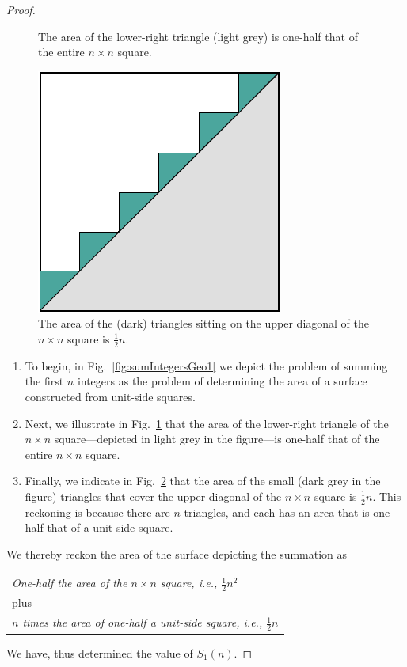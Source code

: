 \begin{proof}
\begin{figure}[h]
\begin{center}
\caption{The area of the lower-right triangle (light grey) is one-half that of
  the entire $n \times n$ square.}
       \label{fig:sumIntegersGeo2}
\end{center}
\end{figure}
\begin{figure}[h]
\begin{center}
       \includegraphics[scale=0.4]{FiguresMaths/SumIntegersGeometricFinal}
\caption{The area of the (dark) triangles sitting on the upper
  diagonal of the $n \times n$ square is $\frac{1}{2} n$.}
       \label{fig:sumIntegersGeo3}
\end{center}
\end{figure}
\begin{enumerate}
\item
To begin, in Fig.~\ref{fig:sumIntegersGeo1} we depict the problem of
summing the first $n$ integers as the problem of determining the area
of a surface constructed from unit-side squares.

\item
Next, we illustrate in Fig.~\ref{fig:sumIntegersGeo2} that the area of
the lower-right triangle of the $n \times n$ square---depicted in
light grey in the figure---is one-half that of the entire $n \times n$
square.

\item
Finally, we indicate in Fig.~\ref{fig:sumIntegersGeo3} that the area
of the small (dark grey in the figure) triangles that cover the upper
diagonal of the $n \times n$ square is $\frac{1}{2} n$.  This
reckoning is because there are $n$ triangles, and each has an area that
is one-half that of a unit-side square.
\end{enumerate}
We thereby reckon the area of the surface depicting the summation as

\begin{tabular}{l}
{\it One-half the area of the $n \times n$ square,
i.e., $\frac{1}{2} n^2$} \\
\hspace*{.15in} plus   \\
{\it $n$ times the area of one-half a unit-side square,
i.e., $\frac{1}{2} n$}
\end{tabular}

\noindent
We have, thus determined the value of $S_1(n)$.
\end{proof}


